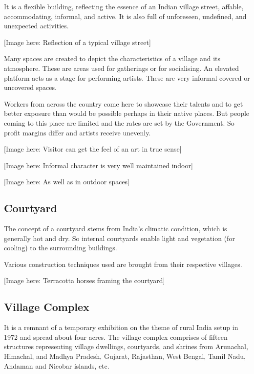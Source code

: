 It is a flexible building, reflecting the essence of an Indian village street, affable, accommodating, informal, and active. It is also full of unforeseen, undefined, and unexpected activities.

[Image here: Reflection of a typical village street]

Many spaces are created to depict the characteristics of a village and its atmosphere. These are areas used for gatherings or for socialising. An elevated platform acts as a stage for performing artists. These are very informal covered or uncovered spaces.

Workers from across the country come here to showcase their talents and to get better exposure than would be possible perhaps in their native places. But people coming to this place are limited and the rates are set by the Government. So profit margins differ and artists receive unevenly.

[Image here: Visitor can get the feel of an art in true sense]

[Image here: Informal character is very well maintained indoor]

[Image here: As well as in outdoor spaces]

\subsection{Courtyard} %
\label{sub:ce_courtyard}

The concept of a courtyard stems from India's climatic condition, which is generally hot and dry. So internal courtyards enable light and vegetation (for cooling) to the surrounding buildings.

Various construction techniques used are brought from their respective villages.

[Image here: Terracotta horses framing the courtyard]


\subsection{Village Complex} %
\label{sub:ce_vc}

It is a remnant of a temporary exhibition on the theme of rural India setup in 1972 and spread about four acres. The village complex comprises of fifteen structures representing village dwellings, courtyards, and shrines from Arunachal, Himachal, and Madhya Pradesh, Gujarat, Rajasthan, West Bengal, Tamil Nadu, Andaman and Nicobar islands, etc.

